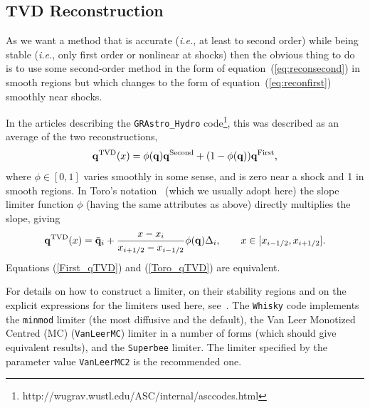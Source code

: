\documentclass{article}
\begin{document}
\subsection{TVD Reconstruction}
\label{sec:tvd}

As we want a method that is accurate ({\it i.e.}, at least to second order)
while being stable ({\it i.e.}, only first order or nonlinear at shocks)
then the obvious thing to do is to use some second-order method in the
form of equation~(\ref{eq:reconsecond}) in smooth regions but which
changes to the form of equation~(\ref{eq:reconfirst}) smoothly near
shocks. 

In the articles describing the {\tt GRAstro\_Hydro}
code\footnote{http://wugrav.wustl.edu/ASC/internal/asccodes.html},
this was described as an average of the two reconstructions, 
\begin{equation}
  {\bf q}^{{\rm TVD}}(x) = \phi({\bf q}) {\bf q}^{{\rm Second}} + (1 -
  \phi({\bf q})) {\bf q}^{{\rm First}},
  \label{First_qTVD}
\end{equation}
where $\phi \in [0,1]$ varies smoothly in some sense, and is zero near
a shock and 1 in smooth regions. In Toro's notation~\cite{toro} (which we usually adopt here) 
the slope limiter function $\phi$ (having the same attributes as above)
directly multiplies the slope, giving
\begin{equation}
  {\bf q}^{{\rm TVD}}(x) = \bar{{\bf q}}_i + \frac{x -
  x_i}{x_{i+1/2} - x_{i-1/2}} \phi({\bf q}) \Delta_i, \qquad x \in [
  x_{i-1/2}, x_{i+1/2} ]. 
  \label{Toro_qTVD}
\end{equation}
Equations (\ref{First_qTVD}) and (\ref{Toro_qTVD}) are equivalent.

For details on how to construct a limiter, on their stability regions and on 
the explicit expressions for the limiters used here,
see~\cite{toro}. The {\tt Whisky} code implements the {\tt minmod} limiter
(the most diffusive and the default), the Van Leer Monotized Centred
(MC) ({\tt VanLeerMC}) limiter in a number of forms (which should give equivalent results), 
and the {\tt Superbee} limiter. The limiter specified by the parameter value {\tt VanLeerMC2} 
is the recommended one.
\end{document}
